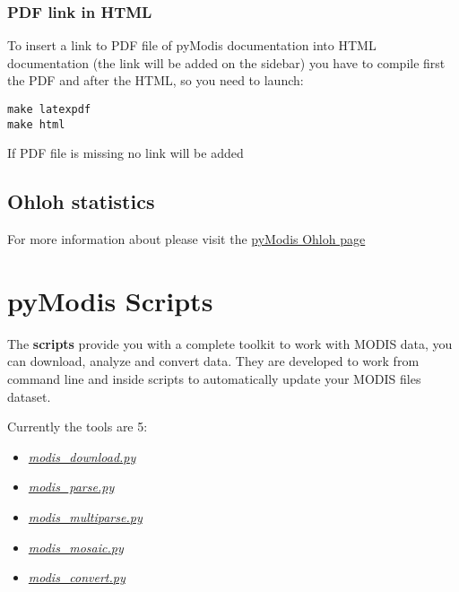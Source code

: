 \documentclass[a4paper,11pt,oneside]{sphinxmanual}
\begin{document}
\subsection{PDF link in HTML}
\label{info:pdf-link-in-html}
To insert a link to PDF file of pyModis documentation into HTML documentation
(the link will be added on the sidebar) you have to compile first the PDF and
after the HTML, so you need to launch:

\begin{Verbatim}[commandchars=\\\{\}]
make latexpdf
make html
\end{Verbatim}

If PDF file is missing no link will be added


\section{Ohloh statistics}
\label{info:ohloh-statistics}
For more information about  please visit the
\href{http://www.ohloh.net/p/pyModis}{pyModis Ohloh page}


\chapter{pyModis Scripts}
\label{scripts/software:pymodis-scripts}\label{scripts/software::doc}
The  \textbf{scripts} provide you with a complete toolkit to work
with MODIS data, you can download, analyze and convert data. They
are developed to work from command line and inside scripts to
automatically update your MODIS files dataset.

Currently the tools are 5:
\begin{itemize}
\item {} 
{\hyperref[scripts/modis_download::doc]{\emph{modis\_download.py}}}

\item {} 
{\hyperref[scripts/modis_parse::doc]{\emph{modis\_parse.py}}}

\item {} 
{\hyperref[scripts/modis_multiparse::doc]{\emph{modis\_multiparse.py}}}

\item {} 
{\hyperref[scripts/modis_mosaic::doc]{\emph{modis\_mosaic.py}}}

\item {} 
{\hyperref[scripts/modis_convert::doc]{\emph{modis\_convert.py}}}

\end{itemize}
\newpage %
\end{document}
